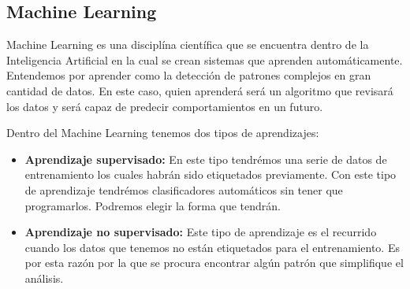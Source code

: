 \subsection{Machine Learning}
Machine Learning es una disciplína científica que se encuentra dentro de la Inteligencia
 Artificial en la cual se crean sistemas que aprenden automáticamente. Entendemos por aprender
 como la detección de patrones complejos en gran cantidad de datos. En este caso, quien aprenderá
 será un algoritmo que revisará los datos y será capaz de predecir comportamientos en un futuro.

Dentro del Machine Learning tenemos dos tipos de aprendizajes:

\begin{itemize}
  \item \textbf{Aprendizaje supervisado:} En este tipo tendrémos una serie de datos de entrenamiento
    los cuales habrán sido etiquetados previamente. Con este tipo de aprendizaje tendrémos clasificadores
    automáticos sin tener que programarlos. Podremos elegir la forma que tendrán.
  \item \textbf{Aprendizaje no supervisado:} Este tipo de aprendizaje es el recurrido cuando
    los datos que tenemos no están etiquetados para el entrenamiento. Es por esta razón por la que
    se procura encontrar algún patrón que simplifique el análisis.
\end{itemize}

